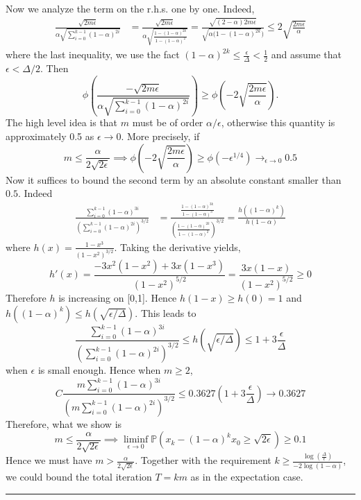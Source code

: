 \documentclass{article}
\theoremstyle{definition}  \newtheorem{exercise}{Exercise}
\theoremstyle{plain}
\newcommand{\PP}{\mathbb{P}}
\renewenvironment{proof}{\par\noindent{\bf Proof\ }}{\hfill\BlackBox\\[2mm]}
\newcommand{\BlackBox}{\rule{1.5ex}{1.5ex}}
\theoremstyle{definition}
\theoremstyle{remark}
\begin{document}
\begin{proof}
Now we analyze the term on the r.h.s. one by one. 
Indeed,
\begin{align*}
    \frac{\sqrt{2m \epsilon}}{\alpha \sqrt{  \sum_{i=0}^{k-1} (1-\alpha)^{2i} }} & = \frac{\sqrt{2m \epsilon}}{\alpha \sqrt{\frac{1-(1-\alpha)^{2k}}{1-(1-\alpha)^2}}} = \frac{\sqrt{(2-\alpha) 2m \epsilon }}{ \sqrt{\alpha(1-(1-\alpha)^{2k}})} 
     \le 2\sqrt{\frac{2m\epsilon}{\alpha}}
\end{align*}
where the last inequality, we use the fact $(1-\alpha)^{2k} \le \frac{\epsilon}{\Delta} < \frac{1}{2}$ and assume that $\epsilon < \Delta/2$. Then
\[  \phi \left ( \frac{-\sqrt{2m \epsilon}}{\alpha \sqrt{  \sum_{i=0}^{k-1} (1-\alpha)^{2i} }}  \right ) \ge   \phi \left ( - 2\sqrt{\frac{2m\epsilon}{\alpha}} \right ).\]
The high level idea is that $m$ must be of order $\alpha/\epsilon$, otherwise this quantity is approximately 0.5 as $\epsilon \rightarrow 0$. More precisely, if 
\[ m \le \frac{\alpha}{2\sqrt{2\epsilon}} \implies \phi \left ( - 2\sqrt{\frac{2m\epsilon}{\alpha}} \right ) \ge \phi \left ( - \epsilon^{1/4} \right ) \rightarrow_{\epsilon \rightarrow 0} 0.5 \]
Now it suffices to bound the second term by an absolute constant smaller than $0.5$. Indeed 
\begin{align*}
    \frac{ \sum_{i=0}^{k-1} (1-\alpha)^{3i}}{( \sum_{i=0}^{k-1} (1-\alpha)^{2i})^{3/2}} &= \frac{ \frac{1- (1-\alpha)^{3k}}{1- (1-\alpha)^3} }{ \left( \frac{1- (1-\alpha)^{2k}}{1- (1-\alpha)^2} \right )^{3/2}} = \frac{h((1-\alpha)^k)}{h(1-\alpha)}
\end{align*}
where $h(x) = \frac{1-x^3}{(1-x^2)^{3/2}}$. Taking the derivative yields, 
\[ h'(x) = \frac{-3x^2(1-x^2) +3x(1-x^3)}{(1-x^2)^{5/2}} = \frac{3x(1-x)}{(1-x^2)^{5/2}} \ge 0\]
Therefore $h$ is increasing on [0,1]. Hence $h(1-x) \ge h(0) = 1$ and $h((1-\alpha)^k) \le h(\sqrt{\epsilon/\Delta})$. This leads to \[ \frac{ \sum_{i=0}^{k-1} (1-\alpha)^{3i}}{( \sum_{i=0}^{k-1} (1-\alpha)^{2i})^{3/2}}  \le h(\sqrt{\epsilon/\Delta}) \le 1 + 3\frac{\epsilon}{\Delta}\]
when $\epsilon$ is small enough. Hence when $m \ge 2$, 
\[ C \frac{ m \sum_{i=0}^{k-1} (1-\alpha)^{3i}}{( m \sum_{i=0}^{k-1} (1-\alpha)^{2i})^{3/2}} \le 0.3627(1 + 3\frac{\epsilon}{\Delta}) \rightarrow 0.3627 \]
Therefore, what we show is 
\[ m \le \frac{\alpha}{2\sqrt{2\epsilon}} \implies \liminf_{\epsilon \rightarrow 0} \PP \left (x_k -(1-\alpha)^{k}x_0 \ge \sqrt{2\epsilon} \right ) \ge 0.1\]
Hence we must have $m > \frac{\alpha}{2\sqrt{2\epsilon}}$. Together with the requirement $ k \ge  \frac{\log \left( \frac{\Delta}{\epsilon} \right )}{-2\log (1-\alpha)}$, we could bound the total iteration $T=km$ as in the expectation case.\\


\end{proof}
\end{document}
